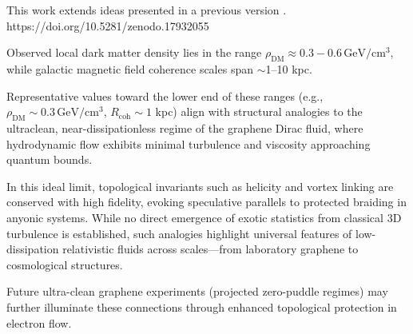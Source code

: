 \documentclass[11pt,a4paper]{article}
\begin{document}
This work extends ideas presented in a previous version \cite{soliman2025_zenodo}.
{https://doi.org/10.5281/zenodo.17932055}

Observed local dark matter density lies in the range $\rho_\mathrm{DM} \approx 0.3 - 0.6 \, \mathrm{GeV/cm^3}$\cite{read2014, lim2025}, while galactic magnetic field coherence scales span $\sim$1--10 kpc\cite{planck2016, beck2025}.

Representative values toward the lower end of these ranges (e.g., $\rho_\mathrm{DM} \sim 0.3 \, \mathrm{GeV/cm^3}$, $R_\mathrm{coh} \sim 1$ kpc) align with structural analogies to the ultraclean, near-dissipationless regime of the graphene Dirac fluid\cite{majumdar2025}, where hydrodynamic flow exhibits minimal turbulence and viscosity approaching quantum bounds.

In this ideal limit, topological invariants such as helicity and vortex linking are conserved with high fidelity\cite{moffatt1992, scheeler2014}, evoking speculative parallels to protected braiding in anyonic systems. While no direct emergence of exotic statistics from classical 3D turbulence is established, such analogies highlight universal features of low-dissipation relativistic fluids across scales—from laboratory graphene to cosmological structures.

Future ultra-clean graphene experiments (projected zero-puddle regimes) may further illuminate these connections through enhanced topological protection in electron flow.
\end{document}
